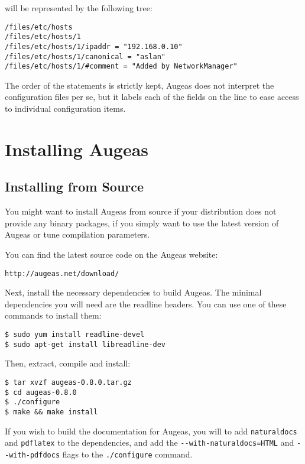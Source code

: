 will be represented by the following tree:

\begin{verbatim}
/files/etc/hosts
/files/etc/hosts/1
/files/etc/hosts/1/ipaddr = "192.168.0.10"
/files/etc/hosts/1/canonical = "aslan"
/files/etc/hosts/1/#comment = "Added by NetworkManager"
\end{verbatim}

The order of the statements is strictly kept, Augeas does not interpret the configuration files per se, but it labels each of the fields on the line to ease access to individual configuration items.

\section{Installing Augeas}

\label{sec:installing_augeas} 

\subsection{Installing from Source}


You might want to install Augeas from source if your distribution does not provide any binary packages, if you simply want to use the latest version of Augeas or tune compilation parameters.

You can find the latest source code on the Augeas website:

\begin{verbatim}
http://augeas.net/download/
\end{verbatim}

Next, install the necessary dependencies to build Augeas. The minimal dependencies you will need are the readline headers. You can use one of these commands to install them:

\begin{verbatim}
$ sudo yum install readline-devel
$ sudo apt-get install libreadline-dev
\end{verbatim}

Then, extract, compile and install:

\begin{verbatim}
$ tar xvzf augeas-0.8.0.tar.gz
$ cd augeas-0.8.0
$ ./configure
$ make && make install
\end{verbatim}

If you wish to build the documentation for Augeas, you will to add \verb!naturaldocs! and \verb!pdflatex! to the dependencies, and add the \verb!--with-naturaldocs=HTML! and \verb!--with-pdfdocs! flags to the \verb!./configure! command.

